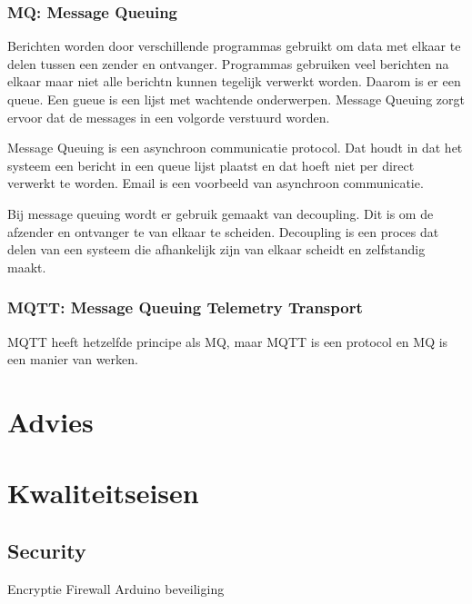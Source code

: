 \documentclass{article}
\begin{document}
\subsubsection{MQ: Message Queuing}
Berichten worden door verschillende programmas gebruikt
om data met elkaar te delen tussen een zender en ontvanger.
Programmas gebruiken veel berichten na elkaar maar niet
alle berichtn kunnen tegelijk verwerkt worden.
Daarom is er een queue. Een gueue is een lijst met wachtende onderwerpen.
Message Queuing zorgt ervoor dat de messages in een volgorde verstuurd worden.

Message Queuing is een asynchroon communicatie protocol.
Dat houdt in dat het systeem een bericht in een queue lijst plaatst
en dat hoeft niet per direct verwerkt te worden.
Email is een voorbeeld van asynchroon communicatie.

Bij message queuing wordt er gebruik gemaakt van decoupling.
Dit is om de afzender en ontvanger te van elkaar te scheiden.
Decoupling is een proces dat delen van een systeem die afhankelijk
zijn van elkaar scheidt en zelfstandig maakt.

 


\subsubsection{MQTT: Message Queuing Telemetry Transport}
MQTT heeft hetzelfde principe als MQ, maar MQTT is een protocol en MQ
is een manier van werken.


\section{Advies}

\section{Kwaliteitseisen}

\subsection{Security}
Encryptie
Firewall
Arduino beveiliging
\end{document}
